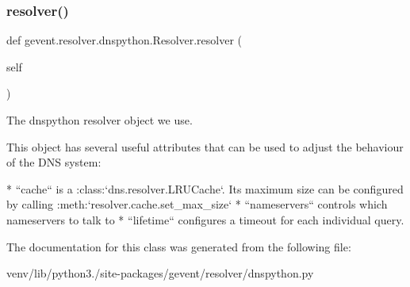 \subsubsection{\texorpdfstring{resolver()}{resolver()}}
{\footnotesize\ttfamily def gevent.\+resolver.\+dnspython.\+Resolver.\+resolver (\begin{DoxyParamCaption}\item[{}]{self }\end{DoxyParamCaption})}

\begin{DoxyVerb}The dnspython resolver object we use.

This object has several useful attributes that can be used to
adjust the behaviour of the DNS system:

* ``cache`` is a :class:`dns.resolver.LRUCache`. Its maximum size
  can be configured by calling :meth:`resolver.cache.set_max_size`
* ``nameservers`` controls which nameservers to talk to
* ``lifetime`` configures a timeout for each individual query.
\end{DoxyVerb}
 

The documentation for this class was generated from the following file\+:\begin{DoxyCompactItemize}
\item 
venv/lib/python3./site-\/packages/gevent/resolver/dnspython.\+py\end{DoxyCompactItemize}

